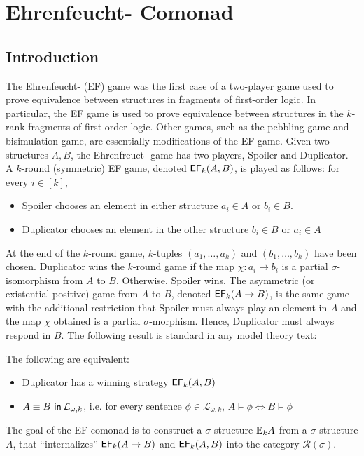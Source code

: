 \chapter{Ehrenfeucht-{\Fraisse} Comonad}
\section{Introduction}
The Ehrenfeucht-{\Fraisse} (EF) game was the first case of a two-player game used to prove equivalence between structures in fragments of first-order logic. In particular, the EF game is used to prove equivalence between structures in the $k$-rank fragments of first order logic. Other games, such as the pebbling game and bisimulation game, are essentially modifications of the EF game. Given two structures $A,B$, the Ehrenfreuct-{\Fraisse} game has two players, Spoiler and Duplicator. A $k$-round (symmetric) EF game, denoted ${\mathsf{EF}_{k}(A,B)}$, is played as follows: for every $i \in [k]$, 
\begin{itemize}
\item Spoiler chooses an element in either structure $a_{i} \in A$ or $b_{i} \in B$. 
\item Duplicator chooses an element in the other structure $b_{i} \in B$ or $a_{i} \in A$  
\end{itemize}
At the end of the $k$-round game, $k$-tuples $(a_{1},\dots,a_{k})$ and $(b_{1},\dots,b_{k})$ have been chosen. Duplicator wins the $k$-round game if the map $\chi:a_{i} \longmapsto b_{i}$ is a partial $\sigma$-isomorphism from $A$ to $B$. Otherwise, Spoiler wins. The asymmetric (or existential positive) game from $A$ to $B$, denoted ${\mathsf{EF}_{k}(A \rightarrow B)}$, is the same game with the additional restriction that Spoiler must always play an element in $A$ and the map $\chi$ obtained is a partial $\sigma$-morphism. Hence, Duplicator must always respond in $B$. The following result is standard in any model theory text:
\begin{prop}
The following are equivalent:
\begin{itemize}
\item Duplicator has a winning strategy ${\mathsf{EF}_{k}(A,B)}$
\item ${A \equiv B \ \mathsf{in}\: \mathcal{L}_{\omega,k}}$, i.e. for every sentence $\phi \in \mathcal{L}_{\omega,k}$, $A \vDash \phi \Leftrightarrow B \vDash \phi$
\end{itemize}
\end{prop}
The goal of the EF comonad is to construct a $\sigma$-structure ${\mathbb{E}_{k}A}$ from a $\sigma$-structure $A$, that ``internalizes'' ${\mathsf{EF}_{k}(A \rightarrow B)}$ and ${\mathsf{EF}_{k}(A,B)}$ into the category $\mathcal{R}(\sigma)$.  
